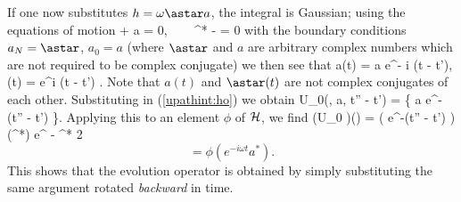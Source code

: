 If one now substitutes $h = \omega \astar a$, the integral is Gaussian;
using the equations of motion 
\beq {} + \isq \omega a = 0, ~~~ ^* - \isq \omega \astar = 0\eeq
with the boundary conditions $a_N = \astar$, $a_0 = a$ 
(where $\astar$ and $a$ are arbitrary complex numbers which are not 
required to be complex conjugate) we then see that 
\beq a(t) = a e^{- i \omega (t - t')}, \eeq
\beq \astar (t) = \astar e^{i \omega (t - t') }. \eeq
Note that $a(t)$ and $\astar (t)$ are not complex conjugates of each other.
Substituting in (\ref{upathint:ho}) we obtain
\beq U_0(\astar, a, t'' - t') = 
\exp \left \{ \isq \astar a e^{-\isq \omega (t'' - t') } \right \}. \eeq
Applying this to an element $\phi$ of ${\mbox{$\cal H$}}$, we find
\beq (U_0 \phi)(\astar) = 
\int \exp \left ( \astar \alpha e^{-\isq \omega (t'' - t') }\right )
\phi (\alpha^*) e^{ - \alpha^* \alpha}  
{2 \pi \isq} \eeq
$$ = \phi (e^{-i \omega t} a^* ). $$
This shows that the evolution operator is obtained by simply 
substituting the same argument rotated {\em backward} in time. 


















